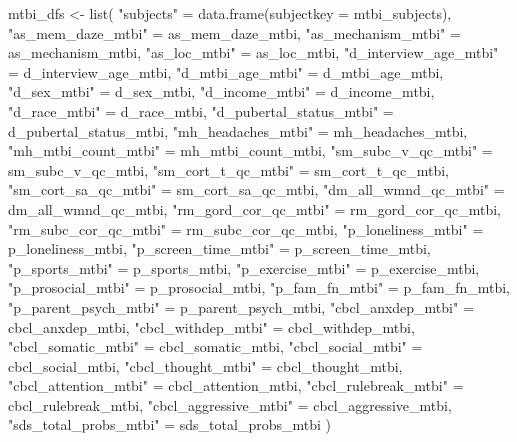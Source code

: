 \documentclass[
  letterpaper,
  DIV=11,
  numbers=noendperiod]{scrreprt}
\newenvironment{Shaded}{\begin{snugshade}}{\end{snugshade}}
\newcommand{\AttributeTok}[1]{\textcolor[rgb]{0.40,0.45,0.13}{#1}}
\newcommand{\FunctionTok}[1]{\textcolor[rgb]{0.28,0.35,0.67}{#1}}
\newcommand{\NormalTok}[1]{\textcolor[rgb]{0.00,0.23,0.31}{#1}}
\newcommand{\OtherTok}[1]{\textcolor[rgb]{0.00,0.23,0.31}{#1}}
\newcommand{\StringTok}[1]{\textcolor[rgb]{0.13,0.47,0.30}{#1}}
\begin{document}
\begin{Shaded}
\begin{Highlighting}[]
\NormalTok{mtbi\_dfs }\OtherTok{\textless{}{-}} \FunctionTok{list}\NormalTok{(}
    \StringTok{"subjects"} \OtherTok{=} \FunctionTok{data.frame}\NormalTok{(}\AttributeTok{subjectkey =}\NormalTok{ mtbi\_subjects),}
    \StringTok{"as\_mem\_daze\_mtbi"} \OtherTok{=}\NormalTok{ as\_mem\_daze\_mtbi,}
    \StringTok{"as\_mechanism\_mtbi"} \OtherTok{=}\NormalTok{ as\_mechanism\_mtbi,}
    \StringTok{"as\_loc\_mtbi"} \OtherTok{=}\NormalTok{ as\_loc\_mtbi,}
    \StringTok{"d\_interview\_age\_mtbi"} \OtherTok{=}\NormalTok{ d\_interview\_age\_mtbi,}
    \StringTok{"d\_mtbi\_age\_mtbi"} \OtherTok{=}\NormalTok{ d\_mtbi\_age\_mtbi,}
    \StringTok{"d\_sex\_mtbi"} \OtherTok{=}\NormalTok{ d\_sex\_mtbi,}
    \StringTok{"d\_income\_mtbi"} \OtherTok{=}\NormalTok{ d\_income\_mtbi,}
    \StringTok{"d\_race\_mtbi"} \OtherTok{=}\NormalTok{ d\_race\_mtbi,}
    \StringTok{"d\_pubertal\_status\_mtbi"} \OtherTok{=}\NormalTok{ d\_pubertal\_status\_mtbi,}
    \StringTok{"mh\_headaches\_mtbi"} \OtherTok{=}\NormalTok{ mh\_headaches\_mtbi,}
    \StringTok{"mh\_mtbi\_count\_mtbi"} \OtherTok{=}\NormalTok{ mh\_mtbi\_count\_mtbi,}
    \StringTok{"sm\_subc\_v\_qc\_mtbi"} \OtherTok{=}\NormalTok{ sm\_subc\_v\_qc\_mtbi,}
    \StringTok{"sm\_cort\_t\_qc\_mtbi"} \OtherTok{=}\NormalTok{ sm\_cort\_t\_qc\_mtbi,}
    \StringTok{"sm\_cort\_sa\_qc\_mtbi"} \OtherTok{=}\NormalTok{ sm\_cort\_sa\_qc\_mtbi,}
    \StringTok{"dm\_all\_wmnd\_qc\_mtbi"} \OtherTok{=}\NormalTok{ dm\_all\_wmnd\_qc\_mtbi,}
    \StringTok{"rm\_gord\_cor\_qc\_mtbi"} \OtherTok{=}\NormalTok{ rm\_gord\_cor\_qc\_mtbi,}
    \StringTok{"rm\_subc\_cor\_qc\_mtbi"} \OtherTok{=}\NormalTok{ rm\_subc\_cor\_qc\_mtbi,}
    \StringTok{"p\_loneliness\_mtbi"} \OtherTok{=}\NormalTok{ p\_loneliness\_mtbi,}
    \StringTok{"p\_screen\_time\_mtbi"} \OtherTok{=}\NormalTok{ p\_screen\_time\_mtbi,}
    \StringTok{"p\_sports\_mtbi"} \OtherTok{=}\NormalTok{ p\_sports\_mtbi,}
    \StringTok{"p\_exercise\_mtbi"} \OtherTok{=}\NormalTok{ p\_exercise\_mtbi,}
    \StringTok{"p\_prosocial\_mtbi"} \OtherTok{=}\NormalTok{ p\_prosocial\_mtbi,}
    \StringTok{"p\_fam\_fn\_mtbi"} \OtherTok{=}\NormalTok{ p\_fam\_fn\_mtbi,}
    \StringTok{"p\_parent\_psych\_mtbi"} \OtherTok{=}\NormalTok{ p\_parent\_psych\_mtbi,}
    \StringTok{"cbcl\_anxdep\_mtbi"} \OtherTok{=}\NormalTok{ cbcl\_anxdep\_mtbi,}
    \StringTok{"cbcl\_withdep\_mtbi"} \OtherTok{=}\NormalTok{ cbcl\_withdep\_mtbi,}
    \StringTok{"cbcl\_somatic\_mtbi"} \OtherTok{=}\NormalTok{ cbcl\_somatic\_mtbi,}
    \StringTok{"cbcl\_social\_mtbi"} \OtherTok{=}\NormalTok{ cbcl\_social\_mtbi,}
    \StringTok{"cbcl\_thought\_mtbi"} \OtherTok{=}\NormalTok{ cbcl\_thought\_mtbi,}
    \StringTok{"cbcl\_attention\_mtbi"} \OtherTok{=}\NormalTok{ cbcl\_attention\_mtbi,}
    \StringTok{"cbcl\_rulebreak\_mtbi"} \OtherTok{=}\NormalTok{ cbcl\_rulebreak\_mtbi,}
    \StringTok{"cbcl\_aggressive\_mtbi"} \OtherTok{=}\NormalTok{ cbcl\_aggressive\_mtbi,}
    \StringTok{"sds\_total\_probs\_mtbi"} \OtherTok{=}\NormalTok{ sds\_total\_probs\_mtbi}
\NormalTok{)}


\end{Highlighting}
\end{Shaded}
\end{document}
